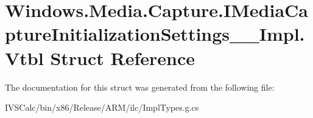 \hypertarget{struct_windows_1_1_media_1_1_capture_1_1_i_media_capture_initialization_settings_____impl_1_1_vtbl}{}\section{Windows.\+Media.\+Capture.\+I\+Media\+Capture\+Initialization\+Settings\+\_\+\+\_\+\+Impl.\+Vtbl Struct Reference}
\label{struct_windows_1_1_media_1_1_capture_1_1_i_media_capture_initialization_settings_____impl_1_1_vtbl}


The documentation for this struct was generated from the following file\+:\begin{DoxyCompactItemize}
\item 
I\+V\+S\+Calc/bin/x86/\+Release/\+A\+R\+M/ilc/Impl\+Types.\+g.\+cs\end{DoxyCompactItemize}
